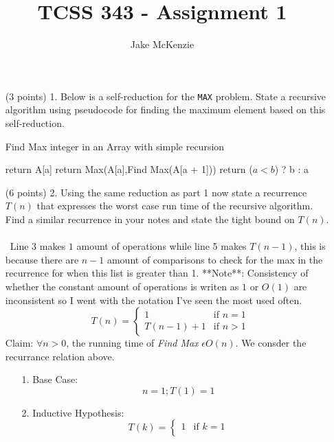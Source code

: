 \documentclass[paper=a4,fontsize=11pt]{article}
\begin{document}
\title{TCSS 343 - Assignment 1}
\author{Jake McKenzie}
\maketitle
\begin{enumerate}
\item [(3 points) 1.] Below is a self-reduction for the \texttt{MAX} problem. State a recursive algorithm using pseudocode for finding the maximum element based on this self-reduction.\\
\begin{algorithm}
\caption{Find Max integer in an Array with simple recursion}
\label{array-max}
\begin{algorithmic}[1]
        \State return A[a]
        \State return Max(A[a],Find Max(A[a + 1]))
    \EndIf
\EndProcedure
{}
    return ($a < b$) ? b : a
\EndProcedure
\end{algorithmic}
\end{algorithm}
\item [(6 points) 2.] Using the same reduction as part 1 now state a recurrence $T(n)$ that expresses the worst case run time of the recursive algorithm. Find a similar recurrence in your notes and state the tight bound on $T(n)$.\\\\\
Line 3 makes $1$ amount of operations while line 5 makes $T(n-1)$, this is because there are $n-1$ amount of comparisons to check for the max in the recurrence for when this list is greater than 1. **Note**: Consistency of whether the constant amount of operations is writen as $1$ or $O(1)$ are inconsistent so I went with the notation I've seen the most used often.
\[
  T(n) =
    \begin{cases}
        1 & \text{if $n = 1$} \\
        T(n-1) + 1 & \text{if $n > 1$}
    \end{cases}
\]
Claim: $\forall n > 0$, the running time of \textit{Find Max} $\epsilon O(n)$. We consder the recurrance relation above.
\begin{enumerate}
\item[1.] Base Case:\\
$$n = 1; T(1) = 1$$
\item[2.] Inductive Hypothesis:\\
\[
  T(k) =
    \begin{cases}
        1 & \text{if $k = 1$} \\

\end{cases}\]
\end{enumerate}
\end{enumerate}
\end{document}
